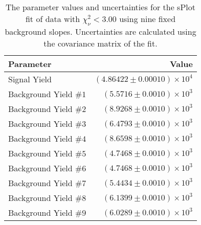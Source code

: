
\begin{table}[h]
    \begin{center}
        \begin{tabular}{lr}\toprule
            Parameter & Value \\\midrule
            Signal Yield & $(4.86422 \pm 0.00010) \times 10^{4}$ \\
            Background Yield $\#1$ & $(5.5716 \pm 0.0010) \times 10^{3}$ \\
            Background Yield $\#2$ & $(8.9268 \pm 0.0010) \times 10^{3}$ \\
            Background Yield $\#3$ & $(6.4793 \pm 0.0010) \times 10^{3}$ \\
            Background Yield $\#4$ & $(8.6598 \pm 0.0010) \times 10^{3}$ \\
            Background Yield $\#5$ & $(4.7468 \pm 0.0010) \times 10^{3}$ \\
            Background Yield $\#6$ & $(4.7468 \pm 0.0010) \times 10^{3}$ \\
            Background Yield $\#7$ & $(5.4434 \pm 0.0010) \times 10^{3}$ \\
            Background Yield $\#8$ & $(6.1399 \pm 0.0010) \times 10^{3}$ \\
            Background Yield $\#9$ & $(6.0289 \pm 0.0010) \times 10^{3}$ \\\bottomrule
        \end{tabular}
        \caption{The parameter values and uncertainties for the sPlot fit of data with $\chi^2_\nu < 3.00$ using nine fixed background slopes. Uncertainties are calculated using the covariance matrix of the fit.}
    \end{center}
\end{table}
